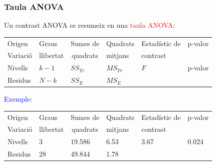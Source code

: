 \documentclass[12pt,t]{beamer}
\newcommand{\red}[1]{\textcolor{red}{#1}}
\newcommand{\blue}[1]{\textcolor{blue}{#1}}
\theoremstyle{plain}
\theoremstyle{definition}
\begin{document}
\begin{frame}
\frametitle{Taula ANOVA}

Un contrast ANOVA es resumeix en una \red{taula ANOVA}:
{\footnotesize \begin{center}
\hspace*{-3ex}
\begin{tabular}{ll@{}@{}l@{}@{}l@{}l@{}l}
\hline
Origen&Graus&\hspace*{0.6ex} Sumes de&\hspace*{1ex} Quadrats&\hspace*{1ex} Estadístic de&\hspace*{1ex} p-valor\\
Variació&llibertat&\multicolumn{1}{c}{quadrats}&\hspace*{1ex} mitjans&\hspace*{1ex} contrast\\\hline
Nivells \vphantom{$\displaystyle \int$} &$k-1$&\hspace*{1ex} $SS_{Tr}$&\hspace*{1ex} $MS_{Tr}$&\hspace*{2ex}$F$&\hspace*{1ex} p-valor \\[1ex]
Residus&$N-k$&\hspace*{1 ex} $SS_E$&\hspace*{1ex} $MS_E$&\\\hline
\end{tabular}
\end{center}}
\pause\medskip

\blue{Exemple}:
{\footnotesize \begin{center}
\begin{tabular}{ll@{}@{}l@{}@{}l@{}l@{}l}
\hline
Origen&Graus&\hspace*{0.6ex} Sumes de&\hspace*{1ex} Quadrats&\hspace*{1ex} Estadístic de & \hspace*{1ex} p-valor\\
Variació&llibertat&\multicolumn{1}{c}{quadrats}&\hspace*{1ex} mitjans&\hspace*{1ex} contrast\\\hline
Nivells \vphantom{$\displaystyle \int$} &3&\hspace*{1ex} 19.586 &\hspace*{1ex} 6.53 &\hspace*{2ex} 3.67 & \hspace*{1ex} 0.024 \\[1ex]
Residus&28&\hspace*{1 ex} 49.844&\hspace*{1ex} 1.78 &\\\hline
\end{tabular}
\end{center}}
\end{frame}
\end{document}
